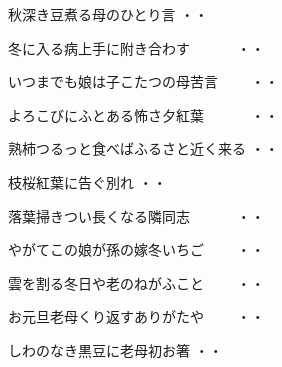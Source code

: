 \vspace{0.6cm}
\begin{shiika}秋深き豆煮る母のひとり言
\hfill{・・}\end{shiika}
\vspace{0.6cm}
\begin{shiika}冬に入る病上手に附き合わす　　　
\hfill{・・}\end{shiika}
\vspace{0.6cm}
\begin{shiika}いつまでも娘は子こたつの母苦言　　
\hfill{・・}\end{shiika}
\vspace{0.6cm}
\begin{shiika}よろこびにふとある怖さ夕紅葉　　　
\hfill{・・}\end{shiika}
\vspace{0.6cm}
\begin{shiika}熟柿つるっと食べばふるさと近く来る
\hfill{・・}\end{shiika}
\vspace{0.6cm}
\begin{shiika}枝桜紅葉に告ぐ別れ
\hfill{・・}\end{shiika}
\vspace{0.6cm}
\begin{shiika}落葉掃きつい長くなる隣同志　　　
\hfill{・・}\end{shiika}
\vspace{0.6cm}
\begin{shiika}やがてこの娘が孫の嫁冬いちご　　
\hfill{・・}\end{shiika}
\vspace{0.6cm}
\begin{shiika}雲を割る冬日や老のねがふこと　　
\hfill{・・}\end{shiika}
\vspace{0.6cm}
\begin{shiika}お元旦老母くり返すありがたや　　
\hfill{・・}\end{shiika}
\vspace{0.6cm}
\begin{shiika}しわのなき黒豆に老母初お箸
\hfill{・・}\end{shiika}
